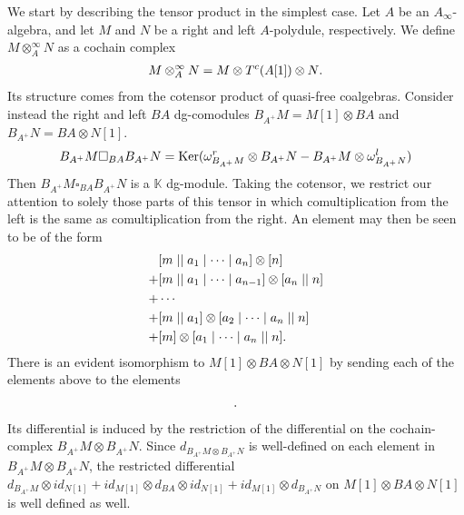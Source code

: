 \documentclass[../thesis.tex]{subfiles}
\begin{document}
            We start by describing the tensor product in the simplest case. Let $A$ be an $A_\infty$-algebra, and let $M$ and $N$ be a right and left $A$-polydule, respectively. We define $M \otimes_A^\infty N$ as a cochain complex
            \begin{align*}
                M \otimes_A^\infty N = M \otimes T^c(A[1]) \otimes N\tt{.}
            \end{align*}
            Its structure comes from the cotensor product of quasi-free coalgebras. Consider instead the right and left $BA$ dg-comodules $B_{A^+}M = M[1] \otimes BA$ and $B_{A^+}N = BA \otimes N[1]$.
            \begin{align*}
                B_{A^+}M \square_{BA} B_{A^+}N = \tt{Ker}(\omega^r_{B_{A^+}M}\otimes B_{A^+}N - B_{A^+}M \otimes \omega^l_{B_{A^+}N})
            \end{align*}
            Then $B_{A^+}M \square_{BA} B_{A^+}N$ is a $\mathbb{K}$ dg-module. Taking the cotensor, we restrict our attention to solely those parts of this tensor in which comultiplication from the left is the same as comultiplication from the right. An element may then be seen to be of the form
            \begin{align*}
                & [m \mid\mid a_1 \mid \cdots \mid a_n] \otimes [n] \\ 
                + & [m \mid\mid a_1 \mid \cdots \mid a_{n-1}]\otimes [a_n \mid\mid n] \\
                + & \cdots \\
                + & [m \mid\mid a_1] \otimes [a_2 \mid \cdots \mid a_n \mid\mid n] \\ 
                + &
                 [m]\otimes [a_1\mid\cdots \mid a_n \mid\mid n]\tt{.}
            \end{align*}
            There is an evident isomorphism to $M[1]\otimes BA \otimes N[1]$ by sending each of the elements above to the elements
            \begin{align*}
                [m \mid\mid a_1 \mid \cdots \mid a_n \mid\mid n]\tt{.}
            \end{align*}
            Its differential is induced by the restriction of the differential on the cochain-complex $B_{A^+}M \otimes B_{A^+}N$. Since $d_{B_{A^+}M\otimes B_{A^+}N}$ is well-defined on each element in $B_{A^+}M \otimes B_{A^+}N$, the restricted differential $d_{B_{A^+}M} \otimes id_{N[1]} + id_{M[1]}\otimes d_{BA} \otimes id_{N[1]} + id_{M[1]}\otimes d_{B_{A^+}N}$ on $M[1] \otimes BA \otimes N[1]$ is well defined as well.
\end{document}
